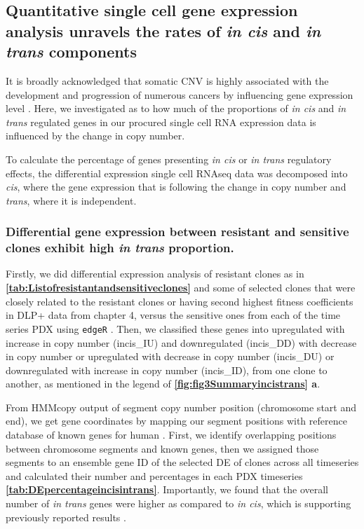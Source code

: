 \subsection{Quantitative single cell gene expression analysis unravels the rates of \textit{in cis} and \textit{in trans} components}

It is broadly acknowledged that somatic CNV is highly associated with the development and progression of numerous cancers by influencing gene expression level \cite{yang2017prame, gut2018sox2}. 
Here, we investigated as to how much of the proportions of \textit{in cis} and \textit{in trans} regulated genes in our procured single cell RNA expression data is influenced by the change in copy number.

To calculate the percentage of genes presenting \textit{in cis} or \textit{in trans} regulatory effects, the differential expression single cell RNAseq data was decomposed into \textit{cis}, where the gene expression that is following the change in copy number and \textit{trans}, where it is independent.

\subsubsection{Differential gene expression between resistant and sensitive clones exhibit high \textit{in trans} proportion.}

Firstly, we did differential expression analysis of resistant clones as in \textbf{\autoref{tab:Listofresistantandsensitiveclones}} and some of selected clones that were closely related to the resistant clones or having second highest fitness coefficients in DLP+ data from chapter 4, versus the sensitive ones from each of the time series PDX using \texttt{edgeR} \cite{robinson2010edger}. Then, we classified these genes into upregulated with increase in copy number (incis\_IU) and downregulated (incis\_DD) with decrease in copy number or upregulated with decrease in copy number (incis\_DU) or downregulated with increase in copy number (incis\_ID), from one clone to another, as mentioned in the legend of \textbf{\autoref{fig:fig3Summaryincistrans} a}.

From HMMcopy output of segment copy number position (chromosome start and end), we get gene coordinates by mapping our segment positions with reference database of known genes for human  \cite{carlson2015txdb}. First, we identify overlapping positions between chromosome segments and known genes, then we assigned those segments to an ensemble gene ID \cite{rainer2019ensembldb} of the  selected \ac{DE} of clones across all timeseries and calculated their number and percentages in each PDX timeseries  \textbf{\autoref{tab:DEpercentageincisintrans}}. Importantly, we found that the overall number of \textit{in trans} genes were higher as compared to \textit{in cis}, which is supporting previously reported results \cite{shao2019copy}. 



